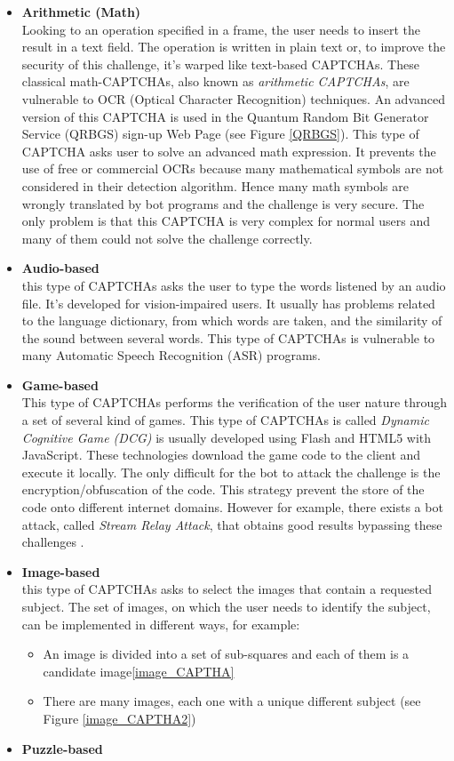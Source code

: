 \begin{itemize}
\item{\textbf{Arithmetic (Math)}\\
Looking to an operation specified in a frame, the user needs to insert the result in a text field. The operation is written in plain text or, to improve the security of this challenge, it's warped like text-based CAPTCHAs. These classical math-CAPTCHAs, also known as \textit{arithmetic CAPTCHAs}, are vulnerable to OCR (Optical Character Recognition) techniques. An advanced version of this CAPTCHA is used in the Quantum Random Bit Generator Service (QRBGS) sign-up Web Page\cite{math_CAPTCHA} (see Figure \ref{QRBGS}). This type of CAPTCHA asks user to solve an advanced math expression. It prevents the use of free or commercial OCRs because many mathematical symbols are not considered in their detection algorithm. Hence many math symbols are wrongly translated by bot programs and the challenge is very secure. The only problem is that this CAPTCHA is very complex for normal users and many of them could not solve the challenge correctly.
}
\item{\textbf{Audio-based}\\
this type of CAPTCHAs asks the user to type the words listened by an audio file. It's developed for vision-impaired users. It usually has problems related to the language dictionary, from which words are taken, and the similarity of the sound between several words. This type of CAPTCHAs is vulnerable to many Automatic Speech Recognition (ASR) programs\cite{improving_audio}.}
\item{\textbf{Game-based}\\
This type of CAPTCHAs performs the verification of the user nature through a set of several kind of games. This type of CAPTCHAs is called \textit{Dynamic Cognitive Game (DCG)} is usually developed using Flash and HTML5 with JavaScript. These technologies download the game code to the client and execute it locally. The only difficult for the bot to attack the challenge is the encryption/obfuscation of the code. This strategy prevent the store of the code onto different internet domains. However for example, there exists a bot attack, called \textit{Stream Relay Attack}, that obtains good results bypassing these challenges \cite{math_CAPTCHA}.
}
\item{\textbf{Image-based}\\
this type of CAPTCHAs asks to select the images that contain a requested subject. The set of images, on which the user needs to identify the subject, can be implemented in different ways, for example:
\begin{itemize}
\item{An image is divided into a set of sub-squares and each of them is a candidate image\ref{image_CAPTHA}}
\item{There are many images, each one with a unique different subject (see Figure \ref{image_CAPTHA2})}
\end{itemize}
}
\item{\textbf{Puzzle-based}\\

}
\end{itemize}
